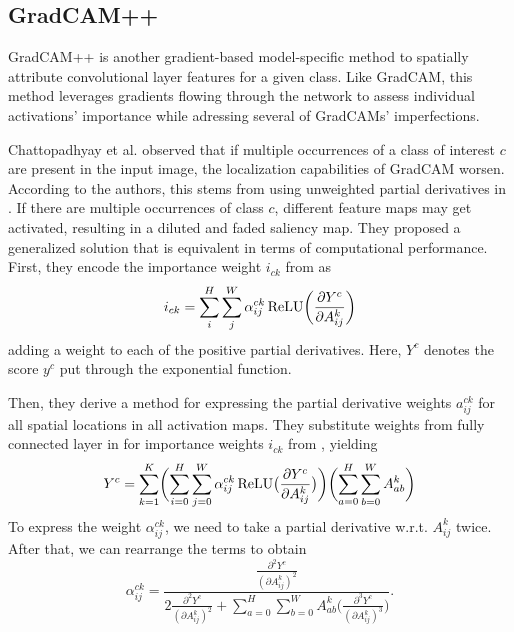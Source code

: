 \subsection{GradCAM++}\label{sub:gradcampp}

GradCAM++ \cite{grad-cam-pp} is another gradient-based model-specific method to spatially attribute convolutional layer features for a given class.
Like GradCAM, this method leverages gradients flowing through the network to assess individual activations' importance while adressing several of GradCAMs' imperfections.

Chattopadhyay et al. \cite{grad-cam-pp} observed that if multiple occurrences of a class of interest $c$ are present in the input image, the localization capabilities of GradCAM worsen.
According to the authors, this stems from using unweighted partial derivatives in .
If there are multiple occurrences of class $c$, different feature maps may get activated, resulting in a diluted and faded saliency map.
They proposed a generalized solution that is equivalent in terms of computational performance.
First, they encode the importance weight $i_{ck}$ from  as
\begin{equation}\label{eq:grad-cam-pp-weights}
    i_{ck} = \sum_i^H \sum_j^W \alpha^{ck}_{ij} \operatorname{ReLU}\biggl(\frac{\partial Y^c}{\partial A^k_{ij}}\biggr)
\end{equation}
adding a weight to each of the positive partial derivatives.
Here, $Y^c$ denotes the score $y^c$ put through the exponential function.

Then, they derive a method for expressing the partial derivative weights $a^{ck}_{ij}$ for all spatial locations in all activation maps.
They substitute weights from fully connected layer in  for importance weights $i_{ck}$ from , yielding
\begin{equation}\label{eq:grad-cam-pp-score}
    Y^c = \sum_{k=1}^K \biggl( \sum_{i=0}^H \sum_{j=0}^W \alpha^{ck}_{ij} \operatorname{ReLU} \bigl(\frac{\partial Y^c}{\partial A^k_{ij}}\bigr) \biggr) \biggl( \sum_{a=0}^H \sum_{b=0}^W A^{k}_{ab} \biggr)
\end{equation}
To express the weight $\alpha^{ck}_{ij}$, we need to take a partial derivative w.r.t. $A^k_{ij}$ twice. After that, we can rearrange the terms to obtain
\begin{equation}
    \alpha^{ck}_{ij} = \frac{\frac{\partial^2 Y^c}{(\partial A^k_{ij})^2}}{2\frac{\partial^2 Y^c}{(\partial A^k_{ij})^2} + \sum_{a=0}^H \sum_{b=0}^W A^{k}_{ab} \bigl( \frac{\partial^3 Y^c}{(\partial A^k_{ij})^3} \bigr)}.
\end{equation}

